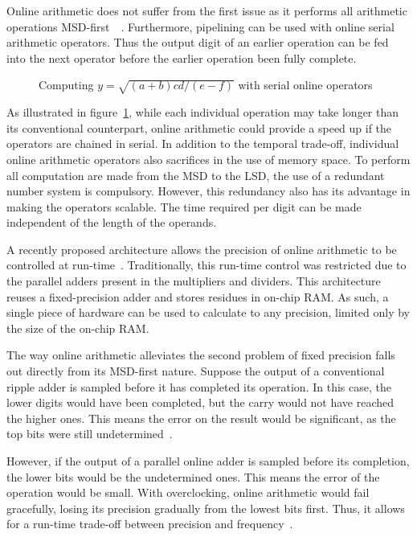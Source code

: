 Online arithmetic does not suffer from the first issue as it performs all
arithmetic operations MSD-first~\cite{Ercegovac1}~\cite{Ercegovac2}.
Furthermore, pipelining can be used with online serial arithmetic operators.
Thus the output digit of an earlier operation can be fed into the next
operator before the earlier operation been fully complete.

\begin{figure}[H]
  \centering
  
  \caption{Computing $y=\sqrt{(a+b)cd/(e-f)}$ with serial online
           operators~\cite{Ercegovac1}}
  \label{Online}
\end{figure}

As illustrated in figure~\ref{Online}, while each individual operation may
take longer than its conventional counterpart, online arithmetic could provide
a speed up if the operators are chained in serial.
In addition to the temporal trade-off, individual online arithmetic operators
also sacrifices in the use of memory space.
To perform all computation are made from the MSD to the LSD, the use of a
redundant number system is compulsory.
However, this redundancy also has its advantage in making the operators
scalable.
The time required per digit can be made independent of the length of the
operands.~\cite{Trivedi1}

A recently proposed architecture allows the precision of
online arithmetic to be controlled at run-time~\cite{Zhao1}.
Traditionally, this run-time control was restricted due to the parallel adders
present in the multipliers and dividers.
This architecture reuses a fixed-precision adder and stores residues in
on-chip RAM.
As such, a single piece of hardware can be used to calculate to any precision,
limited only by the size of the on-chip RAM.

The way online arithmetic alleviates the second problem of fixed precision
falls out directly from its MSD-first nature.
Suppose the output of a conventional ripple adder is sampled before
it has completed its operation.
In this case, the lower digits would have been completed, but the carry would
not have reached the higher ones.
This means the error on the result would be significant, as the top bits
were still undetermined~\cite{Shi1}.

However, if the output of a parallel online adder is sampled before its
completion, the lower bits would be the undetermined ones.
This means the error of the operation would be small.
With overclocking, online arithmetic would fail gracefully, losing its
precision gradually from the lowest bits first.
Thus, it allows for a run-time trade-off between precision and
frequency~\cite{Shi2}.

